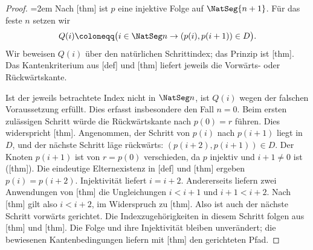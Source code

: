 \begin{proof}
\emergencystretch=2em
Nach [thm] ist \(p\) eine injektive
Folge auf \(\NatSeg{n+1}\). Für das feste \(n\) setzen wir
\[
 Q(i)\coloneqq\bigl(i\in\NatSeg n\rightarrow(p(i),p(i+1))\in D\bigr).
\]
Wir beweisen \(Q(i)\) über den natürlichen Schrittindex; das Prinzip ist
[thm]. Das Kantenkriterium aus
[def] und
[thm] liefert jeweils
die Vorwärts- oder Rückwärtskante.

Ist der jeweils betrachtete Index nicht in \(\NatSeg n\), ist
\(Q(i)\) wegen der falschen Voraussetzung erfüllt. Dies erfasst
insbesondere den Fall \(n=0\). Beim ersten zulässigen Schritt würde
die Rückwärtskante nach \(p(0)=r\)
führen. Dies widerspricht
[thm]. Angenommen, der Schritt
von \(p(i)\) nach \(p(i+1)\) liegt in \(D\), und der nächste Schritt
läge rückwärts: \((p(i+2),p(i+1))\in D\).
Der Knoten \(p(i+1)\) ist von \(r=p(0)\) verschieden, da \(p\)
injektiv und \(i+1\ne0\) ist
([thm]). Die eindeutige
Elternexistenz in [def]
und [thm]
ergeben \(p(i)=p(i+2)\). Injektivität liefert \(i=i+2\).
Andererseits liefern zwei Anwendungen von
[thm] die Ungleichungen
\(i<i+1\) und \(i+1<i+2\). Nach
[thm] gilt also \(i<i+2\), im
Widerspruch zu [thm].
Also ist auch der nächste
Schritt vorwärts gerichtet. Die Indexzugehörigkeiten in diesem Schritt
folgen aus [thm] und
[thm].
Die Folge und ihre Injektivität bleiben unverändert; die bewiesenen
Kantenbedingungen liefern mit
[thm] den gerichteten Pfad.
\end{proof}

